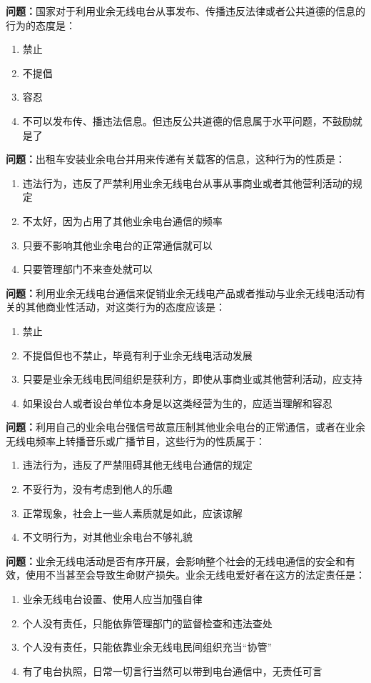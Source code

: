 \textbf{问题：}国家对于利用业余无线电台从事发布、传播违反法律或者公共道德的信息的行为的态度是：
\begin{enumerate}[label=\Alph*), leftmargin=1cm]
	\item 禁止
	\item 不提倡
	\item 容忍
	\item 不可以发布传、播违法信息。但违反公共道德的信息属于水平问题，不鼓励就是了
\end{enumerate}

\textbf{问题：}出租车安装业余电台并用来传递有关载客的信息，这种行为的性质是：
\begin{enumerate}[label=\Alph*), leftmargin=1cm]
	\item 违法行为，违反了严禁利用业余无线电台从事从事商业或者其他营利活动的规定
	\item 不太好，因为占用了其他业余电台通信的频率
	\item 只要不影响其他业余电台的正常通信就可以
	\item 只要管理部门不来查处就可以
\end{enumerate}

\textbf{问题：}利用业余无线电台通信来促销业余无线电产品或者推动与业余无线电活动有关的其他商业性活动，对这类行为的态度应该是：
\begin{enumerate}[label=\Alph*), leftmargin=1cm]
	\item 禁止
	\item 不提倡但也不禁止，毕竟有利于业余无线电活动发展
	\item 只要是业余无线电民间组织是获利方，即使从事商业或其他营利活动，应支持
	\item 如果设台人或者设台单位本身是以这类经营为生的，应适当理解和容忍
\end{enumerate}

\textbf{问题：}利用自己的业余电台强信号故意压制其他业余电台的正常通信，或者在业余无线电频率上转播音乐或广播节目，这些行为的性质属于：
\begin{enumerate}[label=\Alph*), leftmargin=1cm]
	\item 违法行为，违反了严禁阻碍其他无线电台通信的规定
	\item 不妥行为，没有考虑到他人的乐趣
	\item 正常现象，社会上一些人素质就是如此，应该谅解
	\item 不文明行为，对其他业余电台不够礼貌
\end{enumerate}

\textbf{问题：}业余无线电活动是否有序开展，会影响整个社会的无线电通信的安全和有效，使用不当甚至会导致生命财产损失。业余无线电爱好者在这方的法定责任是：
\begin{enumerate}[label=\Alph*), leftmargin=1cm]
	\item 业余无线电台设置、使用人应当加强自律
	\item 个人没有责任，只能依靠管理部门的监督检查和违法查处
	\item 个人没有责任，只能依靠业余无线电民间组织充当“协管”
	\item 有了电台执照，日常一切言行当然可以带到电台通信中，无责任可言
\end{enumerate}

